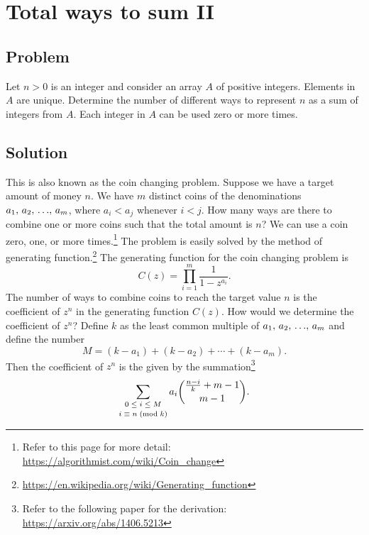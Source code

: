 
\section{Total ways to sum II}



\subsection*{Problem}

Let $n > 0$ is an integer and consider an array $A$ of positive
integers.  Elements in $A$ are unique.  Determine the number of
different ways to represent $n$ as a sum of integers from $A$.  Each
integer in $A$ can be used zero or more times.



\subsection*{Solution}

This is also known as the coin changing problem.  Suppose we have a
target amount of money $n$.  We have $m$ distinct coins of the
denominations ${{a}_1},\, {{a}_2},\, {\dots},\, {{a}_{m}}$, where $a_i < a_j$ whenever $i < j$.  How
many ways are there to combine one or more coins such that the total
amount is $n$?  We can use a coin zero, one, or more times.\footnote{
  Refer to this page for more detail:
  \url{https://algorithmist.com/wiki/Coin_change}
}
The problem is easily solved by the method of generating
function.\footnote{
  \url{https://en.wikipedia.org/wiki/Generating_function}
}
The generating function for the coin changing problem is
\[
C(z)
=
\prod_{i=1}^{m}
\frac{
  1
}{
  1 - z^{a_i}
}.
\]
The number of ways to combine coins to reach the target value $n$ is
the coefficient of $z^n$ in the generating function $C(z)$.  How would
we determine the coefficient of $z^n$?  Define $k$ as the least common
multiple of ${{a}_1},\, {{a}_2},\, {\dots},\, {{a}_{m}}$ and define the number
\[
M
=
(k - a_1)
+
(k - a_2)
+
\cdots
+
(k - a_m).
\]
Then the coefficient of $z^n$ is the given by the summation\footnote{
  Refer to the following paper for the derivation:
  \url{https://arxiv.org/abs/1406.5213}
}
\[
\sum_{\substack{0 \; \leq \; i \; \leq \; M\\[2pt] {i} \; \equiv \; {n} \; (\text{mod}\; {k})}}
a_i
\binom{
  \frac{n-i}{k} + m - 1
}{
  m - 1
}.
\]
